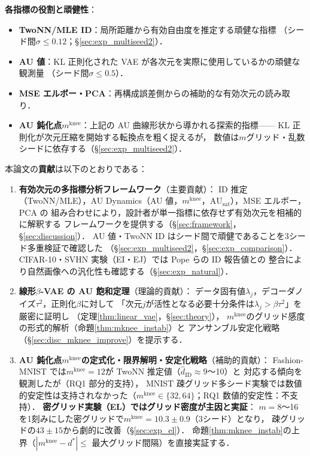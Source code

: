 \documentclass[11pt,a4paper]{jsarticle}
\newcommand{\AUsat}{\mathrm{AU}_{\mathrm{sat}}}
\newcommand{\mknee}{m^{\mathrm{knee}}}
\begin{document}
\textbf{各指標の役割と頑健性}：
\begin{itemize}
  \item \textbf{TwoNN/MLE ID}：局所距離から有効自由度を推定する頑健な指標
        （シード間$\sigma \leq 0.12$；§\ref{sec:exp_multiseed2}）．
  \item \textbf{AU 値}：KL 正則化された VAE が各次元を実際に使用しているかの頑健な観測量
        （シード間$\sigma \leq 0.5$）．
  \item \textbf{MSE エルボー・PCA}：再構成誤差側からの補助的な有効次元の読み取り．
  \item \textbf{AU 鈍化点$\mknee$}：上記の AU 曲線形状から導かれる探索的指標——
        KL 正則化が次元圧縮を開始する転換点を粗く捉えるが，
        数値は$m$グリッド・乱数シードに依存する（§\ref{sec:exp_multiseed2}）．
\end{itemize}

本論文の\textbf{貢献}は以下のとおりである：
\begin{enumerate}
  \item \textbf{有効次元の多指標分析フレームワーク}（主要貢献）：
        ID 推定（TwoNN/MLE），AU Dynamics（AU 値，$\mknee$，$\AUsat$），MSE エルボー，PCA の
        組み合わせにより，設計者が単一指標に依存せず有効次元を相補的に解釈する
        フレームワークを提供する（§\ref{sec:framework}，§\ref{sec:discussion}）．
        AU 値・TwoNN ID はシード間で頑健であることを3シード多重検証で確認した
        （§\ref{sec:exp_multiseed2}，§\ref{sec:exp_comparison}）．
        CIFAR-10・SVHN 実験（EI・EJ）では Pope ら\cite{pope2021intrinsic}の ID 報告値との
        整合により自然画像への汎化性も確認する（§\ref{sec:exp_natural}）．
  \item \textbf{線形$\beta$-VAE の AU 飽和定理}（理論的貢献）：
        データ固有値$\lambda_j$，デコーダノイズ$\tau^2$，正則化$\beta$に対して
        「次元$j$が活性となる必要十分条件は$\lambda_j > \beta\tau^2$」を厳密に証明し
        （定理\ref{thm:linear_vae}，§\ref{sec:theory}），
        $\mknee$のグリッド感度の形式的解析（命題\ref{thm:mknee_instab}）と
        アンサンブル安定化戦略（§\ref{sec:disc_mknee_improve}）を提示する．
  \item \textbf{AU 鈍化点$\mknee$の定式化・限界解明・安定化戦略}（補助的貢献）：
        Fashion-MNIST では$\mknee = 12$が TwoNN 推定値（$\hat{d}_\mathrm{ID} \approx 9$〜10）と
        対応する傾向を観測したが（RQ1 部分的支持），
        MNIST 疎グリッド多シード実験では数値的安定性は支持されなかった（$\mknee \in \{32,64\}$；RQ1 数値的安定性：不支持）．
        \textbf{密グリッド実験（EL）ではグリッド密度が主因と実証}：
        $m=8$〜16を1刻みにした密グリッドで$\mknee = 10.3 \pm 0.9$（3シード）となり，
        疎グリッドの$43 \pm 15$から劇的に改善（§\ref{sec:exp_el}）．
        命題\ref{thm:mknee_instab}の上界（$|\mknee - d^*| \leq$ 最大グリッド間隔）を直接実証する．
\end{enumerate}
\end{document}
